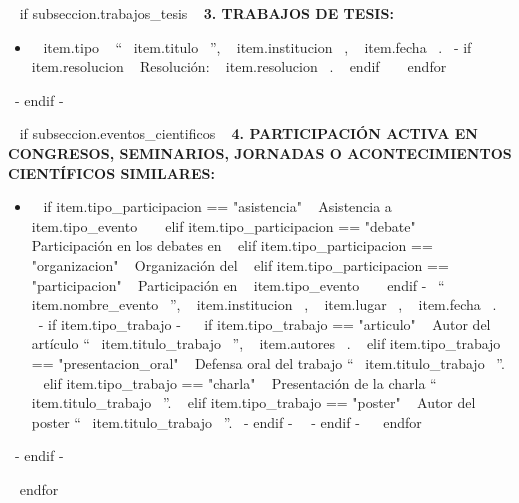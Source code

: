     ~{ if subseccion.trabajos_tesis }~
      \textbf{3. TRABAJOS DE TESIS:}
      \begin{itemize}
      ~{ for item in subseccion.trabajos_tesis }~
        \item ~{{ item.tipo }}~ ``~{{ item.titulo }}~'', ~{{ item.institucion }}~, ~{{ item.fecha }}~.
              ~{- if item.resolucion }~ Resolución: ~{{ item.resolucion }}~. ~{ endif }~
        \espacioEntreItems{}
      ~{ endfor }~
      \end{itemize}
      \espacioEntreSubSecciones{}
    ~{- endif -}~

    ~{ if subseccion.eventos_cientificos }~
      \textbf{4. PARTICIPACIÓN ACTIVA EN CONGRESOS, SEMINARIOS, JORNADAS O ACONTECIMIENTOS CIENTÍFICOS SIMILARES:}
      \begin{itemize}
      ~{ for item in subseccion.eventos_cientificos }~
        \item ~{ if item.tipo_participacion == "asistencia" }~ Asistencia a ~{{ item.tipo_evento }}~
              ~{ elif item.tipo_participacion == "debate" }~ Participación en los debates en
              ~{ elif item.tipo_participacion == "organizacion" }~ Organización del
              ~{ elif item.tipo_participacion == "participacion" }~ Participación en ~{{ item.tipo_evento }}~ ~{ endif -}~
              ``~{{ item.nombre_evento }}~'', ~{{ item.institucion }}~, ~{{ item.lugar }}~, ~{{ item.fecha }}~.
              ~{- if item.tipo_trabajo -}~
                ~{ if item.tipo_trabajo == "articulo" }~ Autor del artículo ``~{{ item.titulo_trabajo }}~'', ~{{ item.autores }}~.
                ~{ elif item.tipo_trabajo == "presentacion_oral" }~ Defensa oral del trabajo ``~{{ item.titulo_trabajo }}~''.
                ~{ elif item.tipo_trabajo == "charla" }~ Presentación de la charla ``~{{ item.titulo_trabajo }}~''.
                ~{ elif item.tipo_trabajo == "poster" }~ Autor del poster ``~{{ item.titulo_trabajo }}~''. ~{- endif -}~
              ~{- endif -}~
        \espacioEntreItems{}
      ~{ endfor }~
      \end{itemize}
      \espacioEntreSubSecciones{}
    ~{- endif -}~

  ~{ endfor }~
  \espacioEntreSecciones{}


